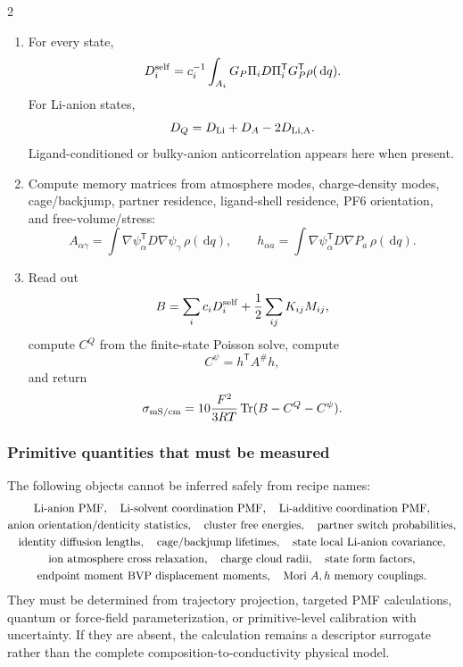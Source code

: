 \documentclass[10pt]{article}
\newcommand{\dd}{\,\mathrm d}
\newcommand{\T}{\mathsf{T}}
\begin{document}
\begin{multicols}{2}
\begin{enumerate}[label={B\arabic*.},leftmargin=*]
\[\qquad
d=\mathbb E[\Delta P],
\qquad
M=\mathbb E[\Delta P\Delta P^\T].
\]
\item For every state,
\[
D_i^{\rm self}
=
c_i^{-1}
\int_{A_i}
G_P\Pi_iD\Pi_i^\T G_P^\T\rho(\dd q).
\]
For Li-anion states,
\[
D_Q=D_{\rm Li}+D_A-2D_{\rm Li,A}.
\]
Ligand-conditioned or bulky-anion anticorrelation appears here when present.
\item Compute memory matrices from atmosphere modes, charge-density modes,
cage/backjump, partner residence, ligand-shell residence, PF6 orientation, and
free-volume/stress:
\[
A_{\alpha\gamma}
=
\int\nabla\psi_\alpha^\T D\nabla\psi_\gamma\,\rho(\dd q),
\qquad
h_{\alpha a}
=
\int\nabla\psi_\alpha^\T D\nabla P_a\,\rho(\dd q).
\]
\item Read out
\[
B=
\sum_i c_iD_i^{\rm self}
+\frac12\sum_{ij}K_{ij}M_{ij},
\]
compute \(C^Q\) from the finite-state Poisson solve, compute
\[
C^\psi=h^\T A^\#h,
\]
and return
\[
\sigma_{\rm mS/cm}
=
10\frac{F^2}{3RT}
\operatorname{Tr}(B-C^Q-C^\psi).
\]
\end{enumerate}

\subsubsection{Primitive quantities that must be measured}

The following objects cannot be inferred safely from recipe names:
\[
\begin{gathered}
{\rm Li\text{-}anion\ PMF},\quad
{\rm Li\text{-}solvent\ coordination\ PMF},\quad
{\rm Li\text{-}additive\ coordination\ PMF},\\
{\rm anion\ orientation/denticity\ statistics},\quad
{\rm cluster\ free\ energies},\quad
{\rm partner\ switch\ probabilities},\\
{\rm identity\ diffusion\ lengths},\quad
{\rm cage/backjump\ lifetimes},\quad
{\rm state\ local\ Li\text{-}anion\ covariance},\\
{\rm ion\ atmosphere\ cross\ relaxation},\quad
{\rm charge\ cloud\ radii},\quad
{\rm state\ form\ factors},\\
{\rm endpoint\ moment\ BVP\ displacement\ moments},\quad
{\rm Mori\ }A,h{\rm \ memory\ couplings}.
\end{gathered}
\]
They must be determined from trajectory projection, targeted PMF calculations,
quantum or force-field parameterization, or primitive-level calibration with
uncertainty. If they are absent, the calculation remains a descriptor
surrogate rather than the complete composition-to-conductivity physical model.


\end{multicols}
\end{document}
